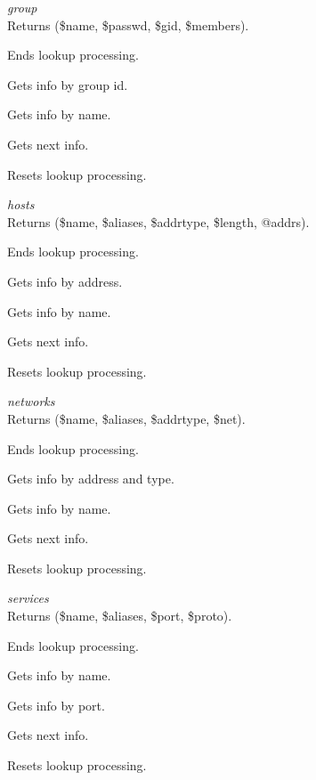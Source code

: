 {\vskip6pt\large\sl group} \\
Returns (\$name, \$passwd, \$gid, \$members).

\begin{enum}{6cm}

Ends lookup processing.

Gets info by group id. 

Gets info by name.

Gets next info.

Resets lookup processing.

\end{enum}

{\vskip6pt\large\sl hosts} \\
Returns (\$name, \$aliases, \$addrtype, \$length, @addrs).

\begin{enum}{6cm}

Ends lookup processing.

Gets info by address.

Gets info by name.

Gets next info.

Resets lookup processing.

\end{enum}

{\vskip6pt\large\sl networks} \\
Returns (\$name, \$aliases, \$addrtype, \$net).

\begin{enum}{6cm}

Ends lookup processing.

Gets info by address and type.

Gets info by name.

Gets next info.

Resets lookup processing.

\end{enum}

{\vskip6pt\large\sl services} \\
Returns (\$name, \$aliases, \$port, \$proto).

\begin{enum}{6cm}

Ends lookup processing.

Gets info by name. 

Gets info by port.

Gets next info.

Resets lookup processing.

\end{enum}


